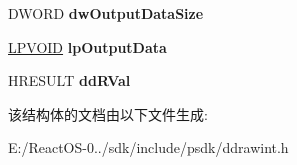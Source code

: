\begin{DoxyCompactItemize}
\item 
\mbox{\label{struct___d_d___b_e_g_i_n_m_o_c_o_m_p_f_r_a_m_e_d_a_t_a_a58043423b241ee300945566453953d64}} 
D\+W\+O\+RD {\bfseries dw\+Output\+Data\+Size}
\item 
\mbox{\label{struct___d_d___b_e_g_i_n_m_o_c_o_m_p_f_r_a_m_e_d_a_t_a_a3b30a96f1f9a3c544b1e7ddad5186499}} 
\hyperlink{interfacevoid}{L\+P\+V\+O\+ID} {\bfseries lp\+Output\+Data}
\item 
\mbox{\label{struct___d_d___b_e_g_i_n_m_o_c_o_m_p_f_r_a_m_e_d_a_t_a_a896aba3e74bfb38b1e08fbaecf6d589f}} 
H\+R\+E\+S\+U\+LT {\bfseries dd\+R\+Val}
\end{DoxyCompactItemize}


该结构体的文档由以下文件生成\+:\begin{DoxyCompactItemize}
\item 
E\+:/\+React\+O\+S-\/0../sdk/include/psdk/ddrawint.\+h\end{DoxyCompactItemize}
